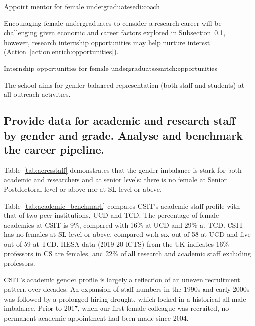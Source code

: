\begin{actionblock}{\ksspace{}Appoint mentor for female undergraduates}{edi:coach}
\actappointmentor
\hfill{
    \hypersetup{hidelinks}
    \hyperlink{b4}{\gotoactionsymbol{}}
}
\end{actionblock}

Encouraging female undergraduates to consider a research career 
will be challenging given economic and career 
factors explored in Subsection~\ref{subsec:academic_research}, 
however,  research internship opportunities may help nurture interest (Action~\ref{action:enrich:opportunities}). 

\begin{actionblock}{\ksspace{}Internship opportunities for female undergraduates}{enrich:opportunities}
\actenrichopportunities
\hfill{
    \hypersetup{hidelinks}
    \hyperlink{b5}{\gotoactionsymbol{}}
}
\end{actionblock}

The school aims for gender balanced  representation (both staff and students) at all outreach activities.


\subsection{Provide data for academic and research staff by gender and grade. Analyse and benchmark the career pipeline.}
\label{subsec:academic_research}




Table~\ref{tab:acresstaff} demonstrates that the gender imbalance is stark for both academic and researchers
and at senior levels: there is no female at Senior Postdoctoral 
level or above nor at \ac{SL} level or above. 

Table~\ref{tab:academic_benchmark} compares CSIT's academic
staff profile with that of two peer institutions, \ac{UCD} 
and \ac{TCD}.
The percentage of female academics at CSIT is 9\%, 
compared with 16\% at UCD and 29\% at TCD. 
CSIT has no females at \ac{SL}
level or above, compared with six out of 58 at UCD and five 
out of 59 at TCD. \ac{HESA} data  (2019-20 ICTS) from the 
UK indicates 16\% professors in \ac{CS} are females, 
and 22\% of all research and academic staff excluding professors.






CSIT's academic gender profile is largely a reflection of an
uneven recruitment pattern over decades. An expansion of
staff numbers in the 1990s and early 2000s was followed by 
a prolonged  hiring drought, which locked in a historical 
all-male imbalance. Prior to 2017, when our first female colleague 
was recruited, no permanent academic appointment
had been made since 2004.


